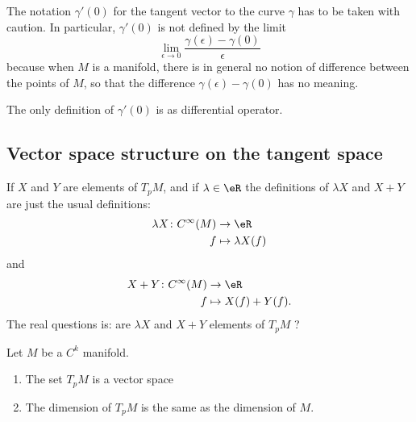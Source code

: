 \begin{remark}      \label{REMooJQFHooQuoZxt}
    The notation \( \gamma'(0)\) for the tangent vector to the curve \( \gamma\) has to be taken with caution. In particular, \( \gamma'(0)\) is not defined by the limit
    \begin{equation}        \label{EQooVMGFooFUCNEY}
        \lim_{\epsilon\to 0} \frac{ \gamma(\epsilon)-\gamma(0) }{ \epsilon }
    \end{equation}
    because when \( M\) is a manifold, there is in general no notion of difference between the points of \( M\), so that the difference \( \gamma(\epsilon)-\gamma(0)\) has no meaning.

    The only definition of \( \gamma'(0)\) is as differential operator.
\end{remark}

\subsection{Vector space structure on the tangent space}

If \( X\) and \( Y \) are elements of \( T_pM\), and if \( \lambda\in \eR\) the definitions of \( \lambda X\) and \( X+Y\) are just the usual definitions: 
\begin{equation}
    \begin{aligned}
        \lambda X\colon  C^{\infty}(M)&\to \eR \\
        f&\mapsto \lambda X(f) 
    \end{aligned}
\end{equation}
and
\begin{equation}
    \begin{aligned}
        X+Y\colon  C^{\infty}(M)&\to \eR \\
        f&\mapsto X(f)+Y(f). 
    \end{aligned}
\end{equation}
The real questions is: are \( \lambda X\) and \( X+Y\) elements of \( T_pM\) ?

\begin{proposition}  \label{PROPooEJBWooSbvypo}
    Let \( M\) be a \( C^k\) manifold.
    \begin{enumerate}
        \item
            The set \( T_pM\) is  a vector space
        \item
            The dimension of \( T_pM\) is the same as the dimension of \( M\).
    \end{enumerate}
\end{proposition}

